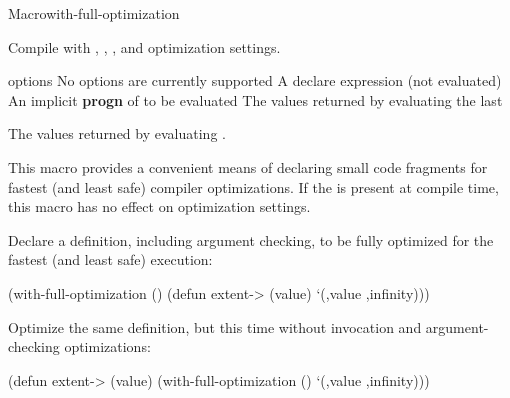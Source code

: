 \documentclass[10pt,twoside,english,pdftex]{article}
\begin{document}

\begin{functiondoc}{Macro}{with-full-optimization}%
  {\code{(}\superstar{}\code{)}
    \superstar{}
    \superstar{} 
    \returns{} \superstar}
%
  
\fnsyntax

\fnpurpose Compile  with , , , and  optimization
settings.

\fnpackage {}

\fnmodule {}

\fnargs
\begin{args}{options}
\arg[option] No options are currently supported
\arg[declaration] A declare expression (not evaluated)
\arg[forms] An implicit \textbf{progn} of  to be evaluated
\arg[results] The values returned by evaluating the last 
\end{args}

\fnreturns The values returned by evaluating .

\fndescription
{}%
This macro provides a convenient means of declaring small code fragments for
fastest (and least safe) compiler optimizations.  If the 
\textbf{} is present at compile time, this macro
has no effect on optimization settings.

\fnexamples Declare a  definition, including argument checking,
to be fully optimized for the fastest (and least safe) execution:
%
\W\supp
\begin{example}
  (with-full-optimization ()
    (defun extent-> (value)
      `(,value ,infinity)))
\end{example}
%
Optimize the same  definition, but this time without
invocation and argument-checking optimizations:
%
\W\supp\notpretop
\begin{example}
  (defun extent-> (value)
    (with-full-optimization ()
      `(,value ,infinity)))
\end{example}

\end{functiondoc}

\end{document}
